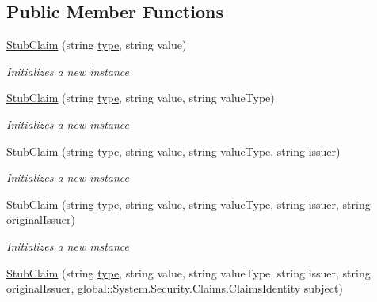 \subsection*{Public Member Functions}
\begin{DoxyCompactItemize}
\item 
\hyperlink{class_system_1_1_security_1_1_claims_1_1_fakes_1_1_stub_claim_a5e51572bd4a1da9faf7b0d403db4c0aa}{Stub\-Claim} (string \hyperlink{jquery-1_810_82-vsdoc_8js_a3940565e83a9bfd10d95ffd27536da91}{type}, string value)
\begin{DoxyCompactList}\small\item\em Initializes a new instance\end{DoxyCompactList}\item 
\hyperlink{class_system_1_1_security_1_1_claims_1_1_fakes_1_1_stub_claim_a4b5d553100f486526c8e2a4ab9d2bf3e}{Stub\-Claim} (string \hyperlink{jquery-1_810_82-vsdoc_8js_a3940565e83a9bfd10d95ffd27536da91}{type}, string value, string value\-Type)
\begin{DoxyCompactList}\small\item\em Initializes a new instance\end{DoxyCompactList}\item 
\hyperlink{class_system_1_1_security_1_1_claims_1_1_fakes_1_1_stub_claim_a6326d9522e243b243f4c343553331d13}{Stub\-Claim} (string \hyperlink{jquery-1_810_82-vsdoc_8js_a3940565e83a9bfd10d95ffd27536da91}{type}, string value, string value\-Type, string issuer)
\begin{DoxyCompactList}\small\item\em Initializes a new instance\end{DoxyCompactList}\item 
\hyperlink{class_system_1_1_security_1_1_claims_1_1_fakes_1_1_stub_claim_a5def14379a9ba2e903e443bf84415290}{Stub\-Claim} (string \hyperlink{jquery-1_810_82-vsdoc_8js_a3940565e83a9bfd10d95ffd27536da91}{type}, string value, string value\-Type, string issuer, string original\-Issuer)
\begin{DoxyCompactList}\small\item\em Initializes a new instance\end{DoxyCompactList}\item 
\hyperlink{class_system_1_1_security_1_1_claims_1_1_fakes_1_1_stub_claim_ae5ec99070469e33c3d61781d782912f2}{Stub\-Claim} (string \hyperlink{jquery-1_810_82-vsdoc_8js_a3940565e83a9bfd10d95ffd27536da91}{type}, string value, string value\-Type, string issuer, string original\-Issuer, global\-::\-System.\-Security.\-Claims.\-Claims\-Identity subject)

\end{DoxyCompactItemize}
